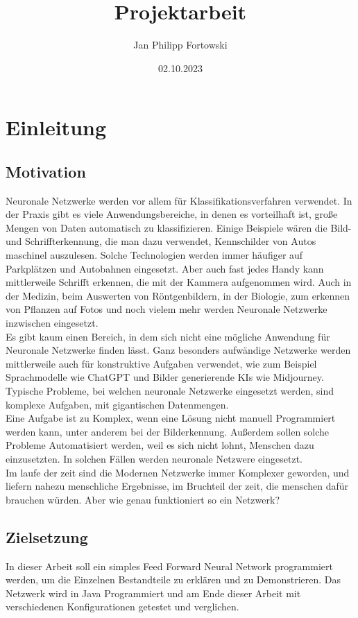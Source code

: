 \documentclass[12pt]{article}
\title{\textbf{Projektarbeit}}
\author{Jan Philipp Fortowski}
\date{02.10.2023}
\begin{document}
\maketitle
\cleardoublepage
\tableofcontents
\cleardoublepage
\thispagestyle{empty}

\section{ Einleitung}
\subsection{Motivation}
Neuronale Netzwerke werden vor allem für Klassifikationsverfahren verwendet. In der Praxis gibt es viele Anwendungsbereiche, in denen es vorteilhaft ist, große Mengen von Daten automatisch zu klassifizieren. Einige Beispiele wären die Bild- und Schriffterkennung, die man dazu verwendet, Kennschilder von Autos maschinel auszulesen. Solche Technologien werden immer häufiger auf Parkplätzen und Autobahnen eingesetzt. Aber auch fast jedes Handy kann mittlerweile Schrifft erkennen, die mit der Kammera aufgenommen wird. Auch in der Medizin, beim Auswerten von Röntgenbildern, in der Biologie, zum erkennen von Pflanzen auf Fotos und noch vielem mehr werden Neuronale Netzwerke inzwischen eingesetzt.\\  
Es gibt kaum einen Bereich, in dem sich nicht eine mögliche Anwendung für Neuronale Netzwerke finden lässt. Ganz besonders aufwändige Netzwerke werden mittlerweile auch für konstruktive Aufgaben verwendet, wie zum Beispiel Sprachmodelle wie ChatGPT und Bilder generierende KIs wie Midjourney.
Typische Probleme, bei welchen neuronale Netzwerke eingesetzt werden, sind komplexe Aufgaben, mit gigantischen Datenmengen.\\
Eine Aufgabe ist zu Komplex, wenn eine Lösung nicht manuell Programmiert werden kann, unter anderem bei der Bilderkennung. Außerdem sollen solche Probleme Automatisiert werden, weil es sich nicht lohnt, Menschen dazu einzusetzten. 
In solchen Fällen werden neuronale Netzwere eingesetzt.\\
Im laufe der zeit sind die Modernen Netzwerke immer Komplexer geworden, und liefern nahezu menschliche Ergebnisse, im Bruchteil der zeit, die menschen dafür brauchen würden. Aber wie genau funktioniert so ein Netzwerk?
\subsection{Zielsetzung}
In dieser Arbeit soll ein simples Feed Forward Neural Network programmiert werden, um die Einzelnen Bestandteile zu erklären und zu Demonstrieren. Das Netzwerk wird in Java Programmiert und am Ende dieser Arbeit mit verschiedenen Konfigurationen getestet und verglichen.
\end{document}
